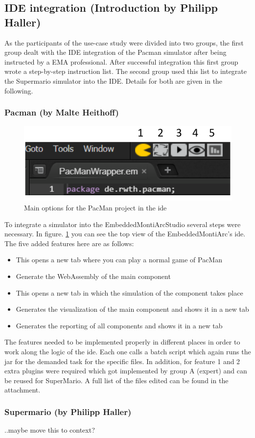 \subsection{IDE integration (Introduction by Philipp Haller)}

As the participants of the use-case study were divided into two groups, the first group dealt with the IDE integration of the Pacman simulator after being instructed by a EMA professional.
After successful integration this first group wrote a step-by-step instruction list. The second group used this list to integrate the Supermario simulator into the IDE. Details for both are given in the following.

\subsubsection{Pacman (by Malte Heithoff)}
\begin{figure}
	\label{fig:idePacmanTop}
	\centering
	\includegraphics[scale=0.55]{pictures/IDE-PacMan-Top.pdf}
	\caption{Main options for the PacMan project in the ide}
\end{figure}
To integrate a simulator into the EmbeddedMontiArcStudio several steps were necessary. In figure. \ref{fig:idePacmanTop} you can see the top view of the EmbeddedMontiArc's ide. The five added features here are as follows:
\begin{itemize}
	\item[1.] This opens a new tab where you can play a normal game of PacMan
	\item[2.] Generate the WebAssembly of the main component
	\item[3.] This opens a new tab in which the simulation of the component takes place
	\item[4.] Generates the visualization of the main component and shows it in a new tab
	\item[5.] Generates the reporting of all components and shows it in a new tab
\end{itemize}
The features needed to be implemented properly in different places in order to work along the logic of the ide. Each one calls a batch script which again runs the jar for the demanded task for the specific files. In addition, for feature 1 and 2 extra plugins were required which got implemented by group A (expert) and can be reused for SuperMario.
A full list of the files edited can be found in the attachment.



\subsubsection{Supermario (by Philipp Haller)}
..maybe move this to context?
